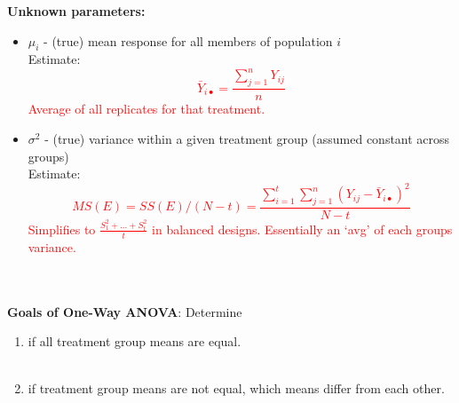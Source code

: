 \textbf{Unknown parameters:}
\begin{itemize}
\item $\mu_{i}$ - (true) mean response for all members of population $i$\\
Estimate:%
\textcolor{red}{$$\bar{Y}_{i\bullet}=\frac{\sum_{j=1}^{n}Y_{ij}}{n}$$
Average of all replicates for that treatment.}\\
\item $\sigma^2$ - (true) variance within a given treatment group (assumed constant across groups)\\
Estimate:%
\textcolor{red}{$$MS(E)=SS(E)/(N-t)=\frac{\sum_{i=1}^{t}\sum_{j=1}^{n}\left(Y_{ij}-\bar{Y}_{i\bullet}\right)^2}{N-t}$$
Simplifies to $\frac{S_1^2+...+S_t^2}{t}$ in balanced designs.  Essentially an `avg' of each groups variance.}\\~\\~\\
\end{itemize}

\textbf{Goals of One-Way ANOVA}: Determine
\begin{enumerate}
\item if all treatment group means are equal.\\~\\
\item if treatment group means are not equal, which means differ from each other.
\end{enumerate}

\newpage

